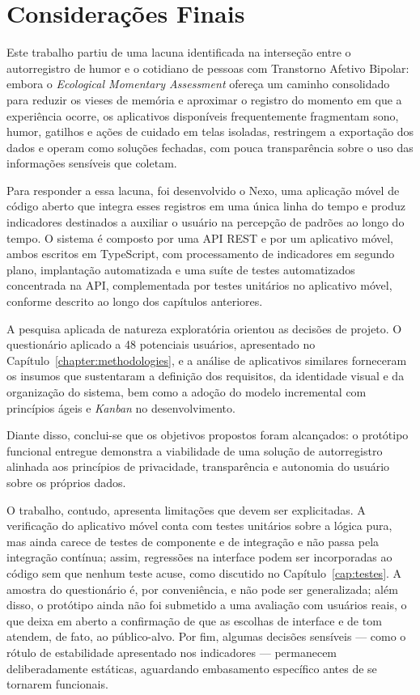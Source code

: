 \chapter{Considerações Finais}

Este trabalho partiu de uma lacuna identificada na interseção entre o
autorregistro de humor e o cotidiano de pessoas com Transtorno Afetivo Bipolar:
embora o \textit{Ecological Momentary Assessment} ofereça um caminho
consolidado para reduzir os vieses de memória e aproximar o registro do momento
em que a experiência ocorre, os aplicativos disponíveis frequentemente
fragmentam sono, humor, gatilhos e ações de cuidado em telas isoladas,
restringem a exportação dos dados e operam como soluções fechadas, com pouca
transparência sobre o uso das informações sensíveis que coletam.

Para responder a essa lacuna, foi desenvolvido o Nexo, uma aplicação móvel de
código aberto que integra esses registros em uma única linha do tempo e produz
indicadores destinados a auxiliar o usuário na percepção de padrões ao longo do
tempo. O sistema é composto por uma API REST e por um aplicativo móvel, ambos
escritos em TypeScript, com processamento de indicadores em segundo plano,
implantação automatizada e uma suíte de testes automatizados concentrada na API,
complementada por testes unitários no aplicativo móvel, conforme descrito ao
longo dos capítulos anteriores.

A pesquisa aplicada de natureza exploratória orientou as decisões de projeto. O
questionário aplicado a 48 potenciais usuários, apresentado no
Capítulo~\ref{chapter:methodologies}, e a análise de aplicativos similares
forneceram os insumos que sustentaram a definição dos requisitos, da identidade
visual e da organização do sistema, bem como a adoção do modelo incremental com
princípios ágeis e \textit{Kanban} no desenvolvimento.

Diante disso, conclui-se que os objetivos propostos foram alcançados: o
protótipo funcional entregue demonstra a viabilidade de uma solução de
autorregistro alinhada aos princípios de privacidade, transparência e autonomia
do usuário sobre os próprios dados.

O trabalho, contudo, apresenta limitações que devem ser explicitadas. A
verificação do aplicativo móvel conta com testes unitários sobre a lógica pura,
mas ainda carece de testes de componente e de integração e não passa pela
integração contínua; assim, regressões na interface podem ser incorporadas ao
código sem que nenhum teste acuse, como discutido no
Capítulo~\ref{cap:testes}. A amostra do questionário é, por conveniência, e não
pode ser generalizada; além disso, o protótipo ainda não foi submetido a uma
avaliação com usuários reais, o que deixa em aberto a confirmação de que as
escolhas de interface e de tom atendem, de fato, ao público-alvo. Por fim,
algumas decisões sensíveis --- como o rótulo de estabilidade apresentado nos
indicadores --- permanecem deliberadamente estáticas, aguardando embasamento
específico antes de se tornarem funcionais.

